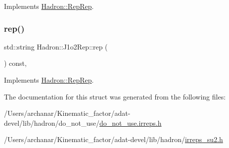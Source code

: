 Implements \mbox{\hyperlink{structHadron_1_1RepRep_ab3213025f6de249f7095892109575fde}{Hadron\+::\+Rep\+Rep}}.

\mbox{\label{structHadron_1_1J1o2Rep_a4e049281173fb575d28821d31e36df00}} 
\subsubsection{\texorpdfstring{rep()}{rep()}\hspace{0.1cm}{\footnotesize\ttfamily [5/5]}}
{\footnotesize\ttfamily std\+::string Hadron\+::\+J1o2\+Rep\+::rep (\begin{DoxyParamCaption}{ }\end{DoxyParamCaption}) const\hspace{0.3cm}{\ttfamily [inline]}, {\ttfamily [virtual]}}



Implements \mbox{\hyperlink{structHadron_1_1RepRep_ab3213025f6de249f7095892109575fde}{Hadron\+::\+Rep\+Rep}}.



The documentation for this struct was generated from the following files\+:\begin{DoxyCompactItemize}
\item 
/\+Users/archanar/\+Kinematic\+\_\+factor/adat-\/devel/lib/hadron/do\+\_\+not\+\_\+use/\mbox{\hyperlink{adat-devel_2lib_2hadron_2do__not__use_2do__not__use_8irreps_8h}{do\+\_\+not\+\_\+use.\+irreps.\+h}}\item 
/\+Users/archanar/\+Kinematic\+\_\+factor/adat-\/devel/lib/hadron/\mbox{\hyperlink{adat-devel_2lib_2hadron_2irreps__su2_8h}{irreps\+\_\+su2.\+h}}\end{DoxyCompactItemize}
